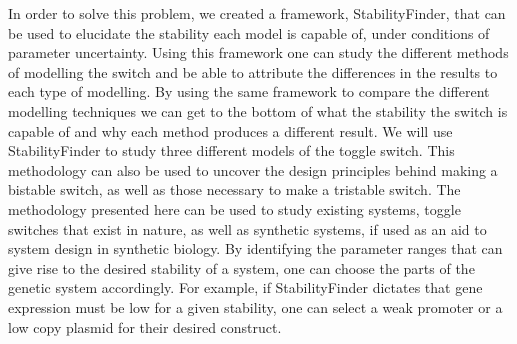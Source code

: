 In order to solve this problem, we created a framework, StabilityFinder, that can be used to elucidate the stability each model is capable of, under conditions of parameter uncertainty. Using this framework one can study the different methods of modelling the switch and be able to attribute the differences in the results to each type of modelling. By using the same framework to compare the different modelling techniques we can get to the bottom of what the stability the switch is capable of and why each method produces a different result. We will use StabilityFinder to study three different models of the toggle switch. This methodology can also be used to uncover the design principles behind making a bistable switch, as well as those necessary to make a tristable switch. The methodology presented here can be used to study existing systems, toggle switches that exist in nature, as well as synthetic systems, if used as an aid to system design in synthetic biology. By identifying the parameter ranges that can give rise to the desired stability of a system, one can choose the parts of the genetic system accordingly. For example, if StabilityFinder dictates that gene expression must be low for a given stability, one can select a weak promoter or a low copy plasmid for their desired construct. 

